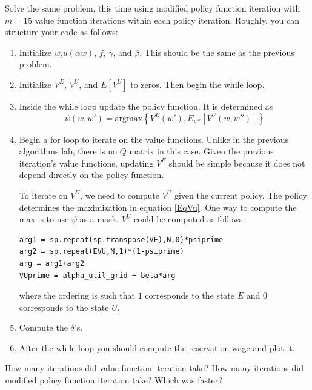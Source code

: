 \begin{problem}
Solve the same problem, this time using modified policy function iteration with $m=15$ value function iterations within each policy iteration.  Roughly, you can structure your code as follows:

\begin{enumerate}
	\item Initialize $w$,$u(\alpha w)$, $f$, $\gamma$, and $\beta$.  This should be the same as the previous problem.
	
	\item	Initialize $V^E$, $V^U$, and $E[V^U]$ to zeros.  Then begin the while loop.
	
	\item Inside the while loop update the policy function.  It is determined as
	\begin{equation}
		\psi (w,w') = \text{argmax} \left\{ V^E(w'), E_{w''}[V^U(w,w'')]\right\}
	\end{equation}
	
	\item Begin a for loop to iterate on the value functions.  Unlike in the previous algorithms lab, there is no $Q$ matrix in this case.  Given the previous iteration's value functions, updating $V^E$ should be simple because it does not depend directly on the policy function.
	
	To iterate on $V^U$, we need to compute $V^U$ given the current policy.  The policy determines the maximization in equation \eqref{EqVu}.  One way to compute the max is to use $\psi$ as a mask.  $V^U$ could be computed as follows:
	
\begin{lstlisting}
arg1 = sp.repeat(sp.transpose(VE),N,0)*psiprime
arg2 = sp.repeat(EVU,N,1)*(1-psiprime)
arg = arg1+arg2
VUprime = alpha_util_grid + beta*arg
\end{lstlisting}	

	where the ordering is such that $1$ corresponds to the state $E$ and $0$ corresponds to the state $U$.
	
	\item Compute the $\delta$'s.
	
	\item After the while loop you should compute the reservation wage and plot it.
\end{enumerate}
\end{problem}

\begin{problem}
How many iterations did value function iteration take?
How many iterations did modified policy function iteration take?
Which was faster?
\end{problem} 